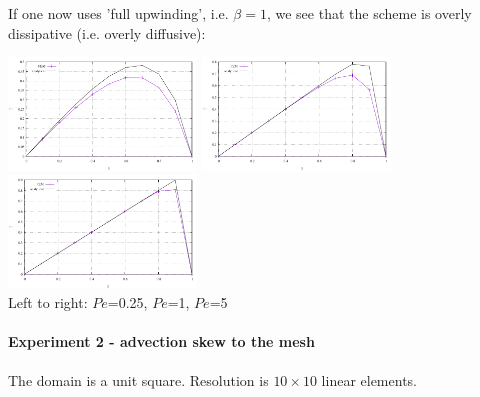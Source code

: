If one now uses 'full upwinding', i.e. $\beta=1$, we see that the scheme is 
overly dissipative (i.e. overly diffusive):

\begin{center}
\includegraphics[width=5cm]{python_codes/fieldstone_65/results/artdiff1/T1.pdf}
\includegraphics[width=5cm]{python_codes/fieldstone_65/results/artdiff1/T2.pdf}
\includegraphics[width=5cm]{python_codes/fieldstone_65/results/artdiff1/T3.pdf}\\
{\captionfont Left to right: $Pe$=0.25, $Pe$=1, $Pe$=5}
\end{center}

\paragraph{Experiment 2 - advection skew to the mesh}

The domain is a unit square. Resolution is $10\times10$ linear elements.

